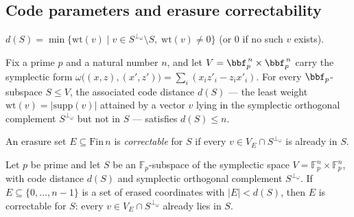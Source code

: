 \subsection{Code parameters and erasure correctability}

\begin{definition}
\label{code_dist}
\leanok
{}
$d(S) = \min\{\mathrm{wt}(v) \mid v \in S^{\perp_\omega} \setminus S,\; \mathrm{wt}(v) \neq 0\}$
(or $0$ if no such $v$ exists).
\end{definition}

\begin{lemma}
\label{code_dist_le_n}
\leanok
{}
Fix a prime $p$ and a natural number $n$, and let $V = \bbf_p^{\,n} \times \bbf_p^{\,n}$
carry the symplectic form $\omega\bigl((x,z),(x',z')\bigr) = \sum_{i} (x_i z'_i - z_i
x'_i)$. For every $\bbf_p$-subspace $S \le V$, the associated code distance $d(S)$ — the
least weight $\mathrm{wt}(v) = |\mathrm{supp}(v)|$ attained by a vector $v$ lying in the
symplectic orthogonal complement $S^{\perp_\omega}$ but not in $S$ — satisfies $d(S) \le
n$.
\end{lemma}

\begin{definition}
\label{correctable}
\leanok
{}
An erasure set $E \subseteq \mathrm{Fin}\,n$ is \emph{correctable} for $S$ if
every $v \in V_E \cap S^{\perp_\omega}$ is already in $S$.
\end{definition}

\begin{lemma}
\label{dist_implies_correctable}
\leanok
{}
Let $p$ be prime and let $S$ be an $\mathbb{F}_p$-subspace of the symplectic space $V =
\mathbb{F}_p^n \times \mathbb{F}_p^n$, with code distance $d(S)$ and symplectic
orthogonal complement $S^{\perp_\omega}$. If $E \subseteq \{0,\dots,n-1\}$ is a set of
erased coordinates with $|E| < d(S)$, then $E$ is correctable for $S$: every $v \in V_E
\cap S^{\perp_\omega}$ already lies in $S$.
\end{lemma}

